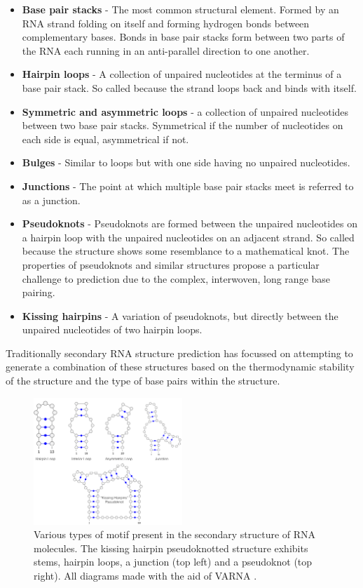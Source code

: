 \documentclass[journal]{IEEEtran}
\begin{document}
\begin{itemize}
	\item \textbf{Base pair stacks} - The most common structural element. Formed by an RNA strand folding on itself and forming hydrogen bonds between complementary bases. Bonds in base pair stacks form between two parts of the RNA each running in an anti-parallel direction to one another. 
	\item \textbf{Hairpin loops} - A collection of unpaired nucleotides at the terminus of a base pair stack. So called because the strand loops back and binds with itself.
	\item \textbf{Symmetric and asymmetric loops} - a collection of unpaired nucleotides between two base pair stacks. Symmetrical if the number of nucleotides on each side is equal, asymmetrical if not.
	\item \textbf{Bulges} - Similar to loops but with one side having no unpaired nucleotides.
	\item \textbf{Junctions} - The point at which multiple base pair stacks meet is referred to as a junction.
	\item \textbf{Pseudoknots} - Pseudoknots are formed between the unpaired nucleotides on a hairpin loop with the unpaired nucleotides on an adjacent strand. So called because the structure shows some resemblance to a mathematical knot. The properties of pseudoknots and similar structures propose a particular challenge to prediction due to the complex, interwoven, long range base pairing.
	\item \textbf{Kissing hairpins} - A variation of pseudoknots, but directly between the unpaired nucleotides of two hairpin loops.
\end{itemize}

Traditionally secondary RNA structure prediction has focussed on attempting to generate a combination of these structures based on the thermodynamic stability of the structure and the type of base pairs within the structure.

\begin{figure}[t]
\centering
\includegraphics[width=0.5\textwidth]{img/secondary_structure_types.png}
\caption{Various types of motif present in the secondary structure of RNA molecules. The kissing hairpin pseudoknotted structure exhibits stems, hairpin loops, a junction (top left) and a pseudoknot (top right). All diagrams made with the aid of VARNA \cite{darty2009varna}.}
\label{fig:secondary-structure-types}
\end{figure}
\end{document}
